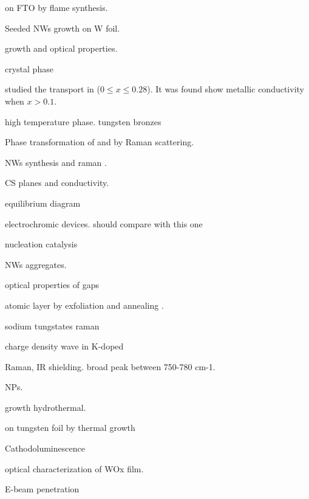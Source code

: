  on FTO by flame synthesis.\cite{Rao2014} \cite{Xu2006}

Seeded  NWs growth on W foil.\cite{Hong2006a}

 growth and optical properties. \cite{Oishi2001} \cite{Itoh2001}

 crystal phase \cite{Viswanathan1974}

\citeauthor{Salje1984} studied the transport in  ($0\leq x \leq 0.28$).\cite{Salje1984} It was found  show metallic conductivity when $x > 0.1$.

 \cite{Migas2010}

 high temperature phase. \cite{Vogt1999}
tungsten bronzes \cite{Wiseman1976}

Phase transformation of  and  by Raman scattering. \cite{Lima2011}

 NWs synthesis and raman \cite{Ma2005}.

 CS planes and conductivity.\cite{Sahle1983}

 equilibrium diagram \cite{Wriedt1989}

 electrochromic devices.\cite{Liu2013d} should compare with this one \cite{Wang2008}

nucleation catalysis \cite{Turnbull1952}

 NWs aggregates. \cite{Kozan2008a}

optical properties of  gaps\cite{Saygin-Hinczewski2008}

 atomic layer by exfoliation and annealing . \cite{Kalantar-zadeh2010a}

sodium tungstates raman \cite{Redkin2010}

charge density wave in K-doped  \cite{Raj2008}

 Raman, IR shielding.\cite{Guo2012} \cite{Guo2011}
broad peak between 750-780 cm-1.

 NPs. \cite{Frey2001}

 growth hydrothermal.\cite{Moshofsky2012}

 on tungsten foil by thermal growth\cite{VanHieu2012}

Cathodoluminescence \cite{Parish2007}

optical characterization of WOx film.\cite{Valyukh2010a}

E-beam penetration \cite{Kanaya2002}

